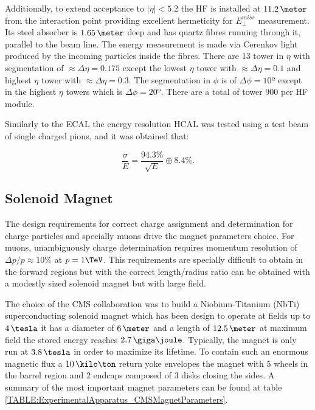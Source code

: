 Additionally, to extend acceptance to $|\eta|<5.2$ the \gls{HF} is installed at $11.2\,\meter$ from the interaction point providing excellent hermeticity for $E_{\perp}^{miss}$ measurement. Its steel absorber is $1.65\,\meter$ deep and has quartz fibres running through it, parallel to the beam line. The energy measurement is made via Cerenkov light produced by the incoming particles inside the fibres. There are 13 tower in $\eta$ with segmentation of $\approx \Delta\eta=0.175$ except the lowest $\eta$ tower with $\approx \Delta\eta=0.1$ and highest $\eta$ tower with $\approx \Delta\eta=0.3$. The segmentation in $\phi$ is of $\Delta\phi=10º$ except in the highest $\eta$ towers which is $\Delta\phi=20º$. There are a total of tower 900 per \gls{HF} module. 

Similarly to the \gls{ECAL} the energy resolution \gls{HCAL} was tested using a test beam of single charged pions\cite{ARTICLE:CMSECALTestBeam}, and it was obtained that:

\begin{equation}
\frac{\sigma}{E} = \frac{94.3\%}{\sqrt{E}} \oplus 8.4\%.
\end{equation}

\subsection{Solenoid Magnet}
\label{SUBSECTION:ExperimentalApparatus_CMS_Magnet}


The design requirements for correct charge assignment and \pt determination for charge particles and specially muons drive the magnet parameters choice. For muons, unambiguously charge determination requires momentum resolution of $\Delta p/p \approx 10\%$ at $p = 1 \TeV$. This requirements are specially difficult to obtain in the forward regions but with the correct length/radius ratio can be obtained with a modestly sized solenoid magnet but with large field\cite{CMSTDR:CMSUpgradeTDR}.

The choice of the \gls{CMS} collaboration was to build a Niobium-Titanium (NbTi) superconducting solenoid magnet which has been design to operate at fields up to $4\,\tesla$ it has a diameter of $6\,\meter$ and a length of $12.5\,\meter$ at maximum field the stored energy reaches $2.7\,\giga\joule$. Typically, the magnet is only run at $3.8\,\tesla$ in order to maximize its lifetime. To contain such an enormous magnetic flux a $10\,\kilo\ton$ return yoke envelopes the magnet with 5 wheels in the barrel region and 2 endcaps composed of 3 disks closing the sides\cite{ARTICLE:TheCMSExperiment}. A summary of the most important magnet parameters can be found at table \ref{TABLE:ExperimentalApparatus_CMSMagnetParameters}.

